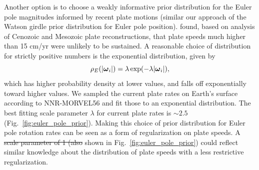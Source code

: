 \documentclass[11pt,letterpaper]{article}
\newcommand{\mitbf}[1]{\hbox{\mathversion{bold}$#1$}}
\providecommand{\DIFaddtex}[1]{{\protect\color{blue}\uwave{#1}}} %
\providecommand{\DIFdeltex}[1]{{\protect\color{red}\sout{#1}}}                      %
\providecommand{\DIFaddbegin}{} %
\providecommand{\DIFaddend}{} %
\providecommand{\DIFdelbegin}{} %
\providecommand{\DIFdelend}{} %
\providecommand{\DIFadd}[1]{\texorpdfstring{\DIFaddtex{#1}}{#1}} %
\providecommand{\DIFdel}[1]{\texorpdfstring{\DIFdeltex{#1}}{}} %
\newcommand{\DIFscaledelfig}{0.5}
\newlength{\DIFdelgraphicswidth} %
\newlength{\DIFdelgraphicsheight} %
\newcommand{\DIFaddincludegraphics}[2][]{{\color{blue}\fbox{\DIFOincludegraphics[#1]{#2}}}} %
\newcommand{\DIFdelincludegraphics}[2][]{%
\sbox{\DIFdelgraphicsbox}{\DIFOincludegraphics[#1]{#2}}%
\settoboxwidth{\DIFdelgraphicswidth}{\DIFdelgraphicsbox} %
\settoboxtotalheight{\DIFdelgraphicsheight}{\DIFdelgraphicsbox} %
\scalebox{\DIFscaledelfig}{%
\parbox[b]{\DIFdelgraphicswidth}{\usebox{\DIFdelgraphicsbox}\\[-\baselineskip] \rule{\DIFdelgraphicswidth}{0em}}\llap{\resizebox{\DIFdelgraphicswidth}{\DIFdelgraphicsheight}{%
\setlength{\unitlength}{\DIFdelgraphicswidth}%
\begin{picture}(1,1)%
\thicklines\linethickness{2pt} %
{\color[rgb]{1,0,0}\put(0,0){\framebox(1,1){}}}%
{\color[rgb]{1,0,0}\put(0,0){\line( 1,1){1}}}%
{\color[rgb]{1,0,0}\put(0,1){\line(1,-1){1}}}%
\end{picture}%
}\hspace*{3pt}}} %
} %
\DeclareRobustCommand{\DIFaddbegin}{\DIFOaddbegin \let\includegraphics\DIFaddincludegraphics} %
\DeclareRobustCommand{\DIFaddend}{\DIFOaddend \let\includegraphics\DIFOincludegraphics} %
\DeclareRobustCommand{\DIFdelbegin}{\DIFOdelbegin \let\includegraphics\DIFdelincludegraphics} %
\DeclareRobustCommand{\DIFdelend}{\DIFOaddend \let\includegraphics\DIFOincludegraphics} %
\begin{document}
Another option is to choose a weakly informative prior distribution for the Euler pole magnitudes informed by recent plate motions (similar our approach of the Watson girdle prior distribution for Euler pole position). \cite{Zahirovic2015a} found, based on analysis of Cenozoic and Mesozoic plate reconstructions, that plate speeds much higher than 15 cm/yr were unlikely to be sustained. A reasonable choice of distribution for strictly positive numbers is the exponential distribution, given by
\begin{equation}
\rho_E(\vert \mitbf{\omega}_i \vert) = \lambda \exp(-\lambda \vert \mitbf{\omega}_i \vert),
\end{equation}
which has higher probability density at lower values, and falls off exponentially toward higher values. We sampled the current plate rates on Earth's surface according to NNR-MORVEL56 and fit those to an exponential distribution. The best fitting scale parameter $\lambda$ for current plate rates is $\sim2.5$ (Fig.~\ref{fig:euler_pole_prior}). Making this choice of prior distribution for Euler pole rotation rates can be seen as a form of regularization on plate speeds. A \DIFdelbegin \DIFdel{scale parameter of 1 (also }\DIFdelend \DIFaddbegin \DIFadd{smaller for $\lambda$ (such as $\lambda =1$ as is }\DIFaddend shown in Fig.~\ref{fig:euler_pole_prior}) could reflect similar knowledge about the distribution of plate speeds with a less restrictive regularization.
\end{document}
